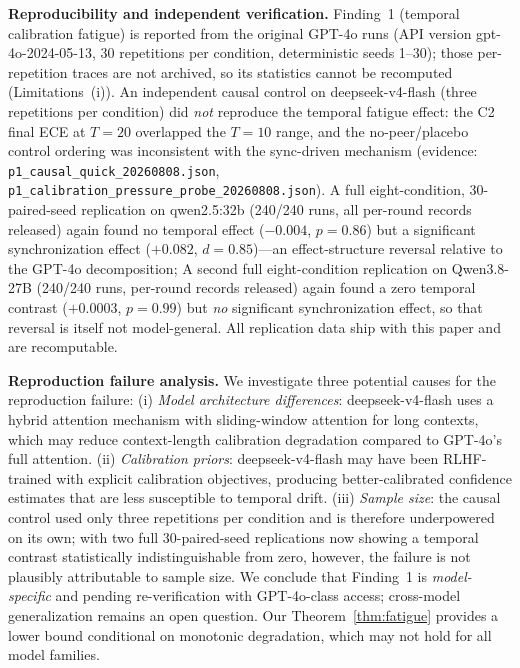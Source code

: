 \documentclass[11pt]{article}
\theoremstyle{definition}
\theoremstyle{remark}
\begin{document}


\textbf{Reproducibility and independent verification.} Finding~1 (temporal calibration fatigue) is reported from the original GPT-4o runs (API version gpt-4o-2024-05-13, 30 repetitions per condition, deterministic seeds 1--30); those per-repetition traces are not archived, so its statistics cannot be recomputed (Limitations~(i)). An independent causal control on deepseek-v4-flash (three repetitions per condition) did \textit{not} reproduce the temporal fatigue effect: the C2 final ECE at $T{=}20$ overlapped the $T{=}10$ range, and the no-peer/placebo control ordering was inconsistent with the sync-driven mechanism (evidence: \texttt{p1\_causal\_quick\_20260808.json}, \texttt{p1\_calibration\_pressure\_probe\_20260808.json}). A full eight-condition, 30-paired-seed replication on qwen2.5:32b (240/240 runs, all per-round records released) again found no temporal effect ($-0.004$, $p = 0.86$) but a significant synchronization effect ($+0.082$, $d = 0.85$)---an effect-structure reversal relative to the GPT-4o decomposition; A second full eight-condition replication on Qwen3.8-27B (240/240 runs, per-round records released) again found a zero temporal contrast ($+0.0003$, $p = 0.99$) but \emph{no} significant synchronization effect, so that reversal is itself not model-general. All replication data ship with this paper and are recomputable.

\textbf{Reproduction failure analysis.} We investigate three potential causes for the reproduction failure: (i) \textit{Model architecture differences}: deepseek-v4-flash uses a hybrid attention mechanism with sliding-window attention for long contexts, which may reduce context-length calibration degradation compared to GPT-4o's full attention. (ii) \textit{Calibration priors}: deepseek-v4-flash may have been RLHF-trained with explicit calibration objectives, producing better-calibrated confidence estimates that are less susceptible to temporal drift. (iii) \textit{Sample size}: the causal control used only three repetitions per condition and is therefore underpowered on its own; with two full 30-paired-seed replications now showing a temporal contrast statistically indistinguishable from zero, however, the failure is not plausibly attributable to sample size. We conclude that Finding~1 is \textit{model-specific} and pending re-verification with GPT-4o-class access; cross-model generalization remains an open question. Our Theorem~\ref{thm:fatigue} provides a lower bound conditional on monotonic degradation, which may not hold for all model families.
\end{document}
